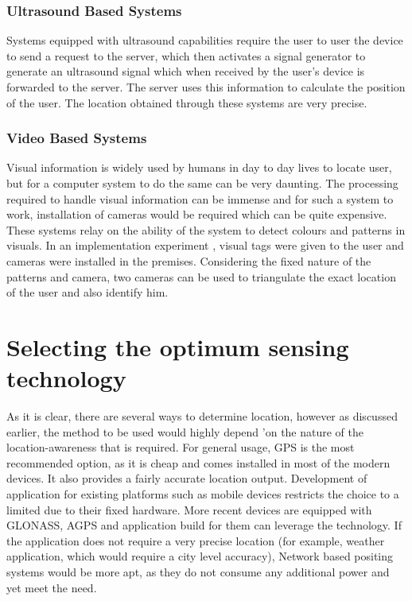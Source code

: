 \documentclass[12pt]{report}
\begin{document}
\subsubsection{Ultrasound Based Systems}
Systems equipped with ultrasound capabilities require the user to user the device to send a request to the server, which then activates a signal generator to generate an ultrasound signal which when received by the user's device is forwarded to the server. The server uses this information to calculate the position of the user. The location obtained through these systems are very precise.


\subsubsection{Video Based Systems}
Visual information is widely used by humans in day to day lives to locate user, but for a computer system to do the same can be very daunting. The processing required to handle visual information can be immense and for such a system to work, installation of cameras would be required which can be quite expensive. These systems relay on the ability of the system to detect colours and patterns in visuals. In an implementation experiment \cite{starner1997augmented}, visual tags  were given to the user and cameras were installed in the premises. Considering the fixed nature of the patterns and camera, two cameras can be used to triangulate the exact location of the user and also identify him.

\section{Selecting the optimum sensing technology}

As it is clear, there are several ways to determine location, however as discussed earlier, the method to be used would highly depend 'on the nature of the location-awareness that is required. For general usage, GPS is the most recommended option, as it is cheap and comes installed in most of the modern devices. It also provides a fairly accurate location output. Development of application for existing platforms such as mobile devices restricts the choice to a limited due to their fixed hardware. More recent devices are equipped with GLONASS, AGPS and application build for them can leverage the technology. If the application does not require a very precise location (for example, weather application, which would require a city level accuracy), Network based positing systems would be more apt, as they do not consume any additional power and yet meet the need.
\end{document}
